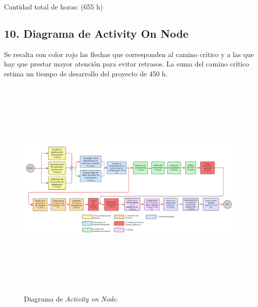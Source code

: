 \documentclass[
11pt, %
codirector, %
]{charter}
\begin{document}
Cantidad total de horas: (655 h)

\newpage
\begin{landscape}
\section{10. Diagrama de Activity On Node}
\label{sec:AoN}
Se resalta con color rojo las flechas que corresponden al camino crítico y a las que hay que prestar mayor atención para evitar retrasos. La suma del camino crítico estima un tiempo de desarrollo del proyecto de 450 h.

\begin{figure}[htpb]
	\centering 
	\includegraphics[width=22cm, height=11cm]{./Figuras/diagramaAc.png}
	\caption{Diagrama de \textit{Activity on Node}.}
	\label{fig:AoN}
\end{figure}
\end{landscape}
\end{document}
